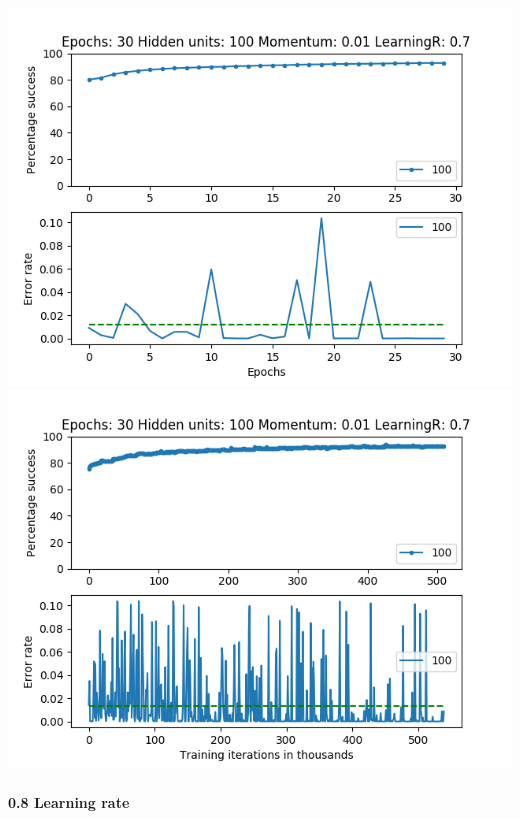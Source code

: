 \documentclass[11pt]{article}
\makeatletter
\def\maxwidth{\ifdim\Gin@nat@width>\linewidth\linewidth
    \else\Gin@nat@width\fi}
\let\Oldincludegraphics\includegraphics
\renewcommand{\includegraphics}[1]{\Oldincludegraphics[width=.8\maxwidth]{#1}}
\makeatother
\begin{document}
\includegraphics{Experiment2/E2_NN_Epoch_Momentum_0.01_30Epochs_100_LR_0.7_Hiddenunits.png}
\includegraphics{Experiment2/E2_NN_Training_Momentum_0.01_30Epochs_100_LR_0.7_Hiddenunits.png}

\hypertarget{learning-rate-8}{%
\paragraph{0.8 Learning rate}\label{learning-rate-8}}
\end{document}
